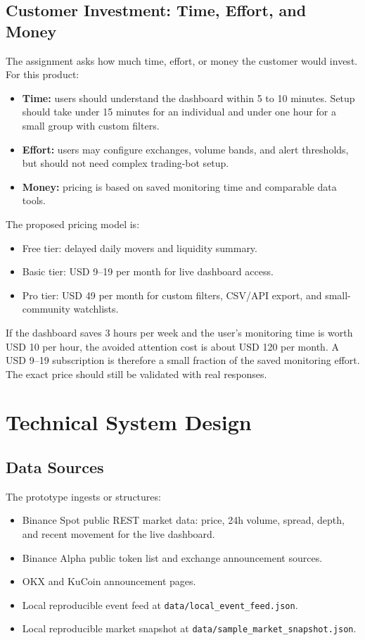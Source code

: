 \documentclass[11pt]{article}
\begin{document}
\subsection{Customer Investment: Time, Effort, and Money}

The assignment asks how much time, effort, or money the customer would invest. For this product:
\begin{itemize}
  \item \textbf{Time:} users should understand the dashboard within 5 to 10 minutes. Setup should take under 15 minutes for an individual and under one hour for a small group with custom filters.
  \item \textbf{Effort:} users may configure exchanges, volume bands, and alert thresholds, but should not need complex trading-bot setup.
  \item \textbf{Money:} pricing is based on saved monitoring time and comparable data tools.
\end{itemize}

The proposed pricing model is:
\begin{itemize}
  \item Free tier: delayed daily movers and liquidity summary.
  \item Basic tier: USD 9--19 per month for live dashboard access.
  \item Pro tier: USD 49 per month for custom filters, CSV/API export, and small-community watchlists.
\end{itemize}

If the dashboard saves 3 hours per week and the user's monitoring time is worth USD 10 per hour, the avoided attention cost is about USD 120 per month. A USD 9--19 subscription is therefore a small fraction of the saved monitoring effort. The exact price should still be validated with real responses.

\section{Technical System Design}

\subsection{Data Sources}

The prototype ingests or structures:
\begin{itemize}
  \item Binance Spot public REST market data: price, 24h volume, spread, depth, and recent movement for the live dashboard.
  \item Binance Alpha public token list and exchange announcement sources.
  \item OKX and KuCoin announcement pages.
  \item Local reproducible event feed at \texttt{data/local\_event\_feed.json}.
  \item Local reproducible market snapshot at \texttt{data/sample\_market\_snapshot.json}.
\end{itemize}
\end{document}
